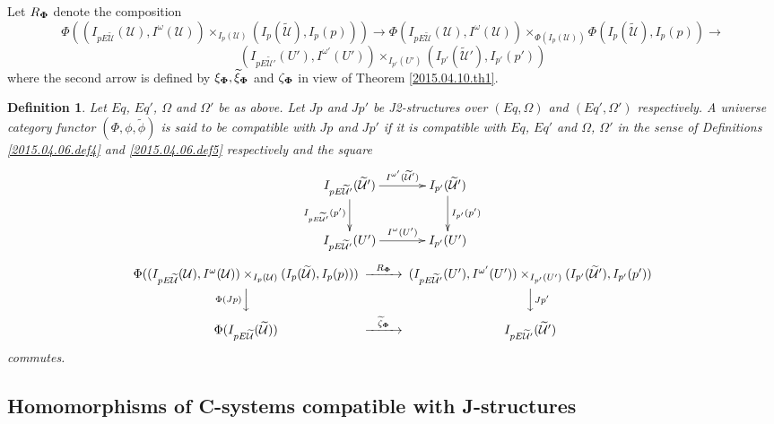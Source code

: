 \documentclass[12pt]{article}
\numberwithin{equation}{section}
\newtheorem{definition}[proposition]{Definition}
\newcommand{\llabel}[1]{\label{#1}}
\newcommand{\sr}{\rightarrow}
\newcommand{\wt}{\widetilde}
\newcommand{\U}{\mathcal{U}}
\begin{document}
%
Let $R_{\bf\Phi}$ denote the composition
%
$$\Phi((I_{pE\wt{\U}}(\U), I^{\omega}(\U))\times_{I_p(\U)} (I_p(\wt{\U}),
I_p(p)))\sr \Phi(I_{pE\wt{\U}}(\U),
I^{\omega}(\U))\times_{\Phi(I_p(\U))}\Phi(I_p(\wt{\U}), I_p(p))\sr$$
$$(I_{pE\wt{\U}'}(U'),I^{\omega'}(U'))\times_{I_{p'}(U')}(I_{p'}(\wt{\U}'),I_{p'}(p'))$$
%
where the second arrow is defined by $\xi_{\bf\Phi}, \wt{\xi}_{\bf\Phi}$ and
$\zeta_{\bf\Phi}$ in view of Theorem \ref{2015.04.10.th1}.
%
\begin{definition}
\llabel{2015.04.06.def6} Let $Eq$, $Eq'$, $\Omega$ and $\Omega'$ be as
above. Let $Jp$ and $Jp'$ be J2-structures over $(Eq,\Omega)$ and
$(Eq',\Omega')$ respectively.  A universe category functor
$(\Phi,\phi,\wt{\phi})$ is said to be compatible with $Jp$ and $Jp'$ if it is
compatible with $Eq$, $Eq'$ and $\Omega$, $\Omega'$ in the sense of Definitions
\ref{2015.04.06.def4} and \ref{2015.04.06.def5} respectively and the square
%
$$
\begin{xy}
          \xymatrix@C=3pc{ I_{pE\wt{\U}'}(\wt{\U}')
            \ar[r]^-{I^{\omega'}(\wt{\U}')} \ar[d]_-{I_{pE\wt{\U}'}(p')} &
            I_{p'}(\wt{\U}')\ar[d]^-{I_{p'}(p')}\\ I_{pE\wt{\U}'}(U')
            \ar[r]^-{I^{\omega}(U')} & I_{p'}(U') }
\end{xy}
$$
$$
\begin{CD}
\Phi((I_{pE\wt{\U}}(\U), I^{\omega}(\U))\times_{I_p(\U)} (I_p(\wt{\U}), I_p(p)))
@>R_{\bf\Phi}>>
(I_{pE\wt{\U}'}(U'),I^{\omega'}(U'))\times_{I_{p'}(U')}(I_{p'}(\wt{\U}'),I_{p'}(p'))\\ @V\Phi(Jp)
VV @VVJp' V\\ \Phi(I_{pE\wt{\U}}(\wt{\U})) @>\wt{\zeta}_{\bf\Phi}>>
I_{pE\wt{\U}'}(\wt{\U}')
\end{CD}
$$
%
commutes.
\end{definition}













\subsection{Homomorphisms of C-systems compatible with J-structures}
%
\end{document}

